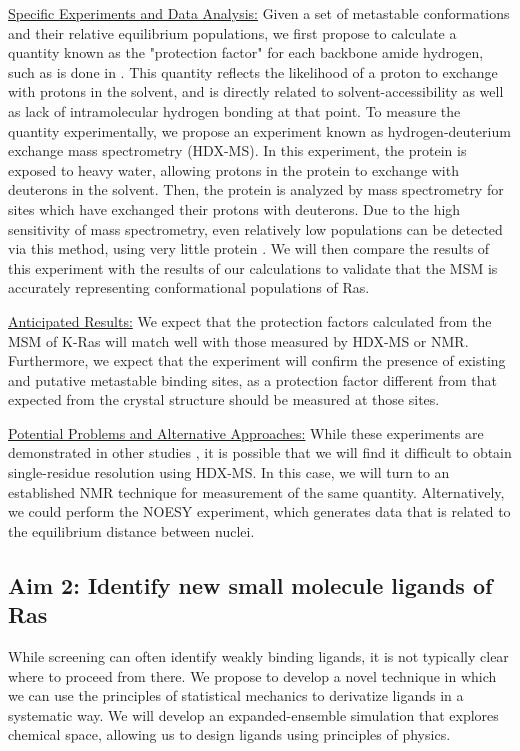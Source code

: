 \documentclass[12pt]{article}
\begin{document}
\underline{Specific Experiments and Data Analysis:} Given a set of metastable conformations and their relative equilibrium populations, we first propose to calculate a quantity known as the "protection factor" for each backbone amide hydrogen, such as is done in \cite{hx}. This quantity reflects the likelihood of a proton to exchange with protons in the solvent, and is directly related to solvent-accessibility as well as lack of intramolecular hydrogen bonding at that point. To measure the quantity experimentally, we propose an experiment known as hydrogen-deuterium exchange mass spectrometry (HDX-MS). In this experiment, the protein is exposed to heavy water, allowing protons in the protein to exchange with deuterons in the solvent. Then, the protein is analyzed by mass spectrometry for sites which have exchanged their protons with deuterons. Due to the high sensitivity of mass spectrometry, even relatively low populations can be detected via this method, using very little protein \cite{hdxms}. We will then compare the results of this experiment with the results of our calculations to validate that the MSM is accurately representing conformational populations of Ras. 

\underline{Anticipated Results:} We expect that the protection factors calculated from the MSM of K-Ras will match well with those measured by HDX-MS or NMR. Furthermore, we expect that the experiment will confirm the presence of existing and putative metastable binding sites, as a protection factor different from that expected from the crystal structure should be measured at those sites.

\underline{Potential Problems and Alternative Approaches:} While these experiments are demonstrated in other studies \cite{hdxms}, it is possible that we will find it difficult to obtain single-residue resolution using HDX-MS. In this case, we will turn to an established NMR technique for measurement of the same quantity. Alternatively, we could perform the NOESY experiment, which generates data that is related to the equilibrium distance between nuclei. 
  
  
  
\subsection*{Aim 2: Identify new small molecule ligands of Ras}
While screening can often identify weakly binding ligands, it is not typically clear where to proceed from there. We propose to develop a novel technique in which we can use the principles of statistical mechanics to derivatize ligands in a systematic way. We will develop an expanded-ensemble simulation that explores chemical space, allowing us to design ligands using principles of physics.
\end{document}
